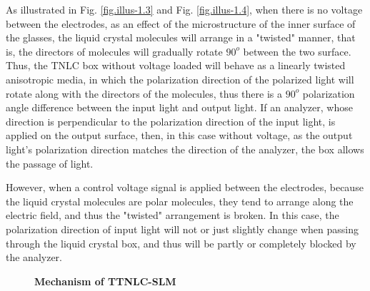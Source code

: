 \documentclass[10pt,a4paper,twocolumn,twoside,UTF8]{article}
\begin{document}
		As illustrated in Fig. \ref{fig.illus-1.3} and Fig. \ref{fig.illus-1.4}, when there is no voltage between the electrodes, as an effect of the microstructure of the inner surface of the glasses, the liquid crystal molecules will arrange in a "twisted" manner, that is, the directors of molecules will gradually rotate $90^o$ between the two surface. 
		Thus, the TNLC box without voltage loaded will behave as a linearly twisted anisotropic media, in which the polarization direction of the polarized light will rotate along with the directors of the molecules, thus there is a $90^o$ polarization angle difference between the input light and output light. 
		If an analyzer, whose direction is perpendicular to the polarization direction of the input light, is applied on the output surface, then, in this case without voltage, as the output light's polarization direction matches the direction of the analyzer, the box allows the passage of light.
		
		However, when a control voltage signal is applied between the electrodes, because the liquid crystal molecules are polar molecules, they tend to arrange along the electric field, and thus the "twisted" arrangement is broken. 
		In this case, the polarization direction of input light will not or just slightly change when passing through the liquid crystal box, and thus will be partly or completely blocked by the analyzer. 
		
		\begin{figure}[htbp]
			\centering		
			\caption{\textbf{Mechanism of TTNLC-SLM}}
		\end{figure}
\end{document}
